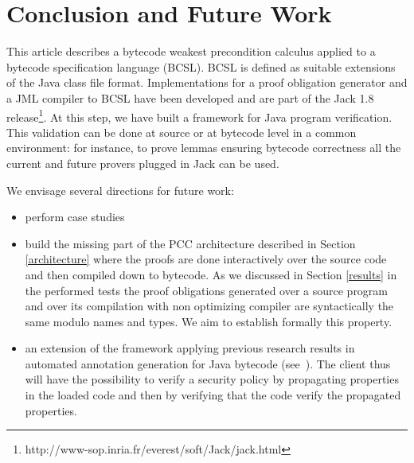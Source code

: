 \section{Conclusion and Future Work}\label{conclusion}
This article describes a bytecode weakest precondition calculus applied to a bytecode specification language (BCSL).
BCSL is defined as suitable extensions of the Java class file format.
Implementations for a proof obligation generator and a JML compiler to BCSL have been developed and are part of the Jack 1.8 release\footnote{http://www-sop.inria.fr/everest/soft/Jack/jack.html}.
At this step, we have built a framework for Java program verification. This validation can be done at source or at bytecode level in a common environment: for instance, to prove lemmas ensuring bytecode correctness all the current and future provers plugged in Jack can be used.

 We envisage several directions for future work:
\begin{itemize}
  \item perform case studies
  \item build the missing part of the PCC architecture described in Section \ref{architecture} where the proofs are done interactively over the source code
and then compiled down to bytecode. As we discussed in Section \ref{results} in the performed tests the 
proof obligations generated over a source program and over its compilation with non optimizing compiler are
 syntactically the same modulo names and types. We aim to establish formally this property.  
  \item an extension of the framework applying previous research results in automated annotation generation for
 Java bytecode (see~\cite{PBBHL}). The client thus will have the possibility to verify a security policy by
 propagating properties in the loaded code and then by verifying that the code verify the propagated properties.

\end{itemize}



